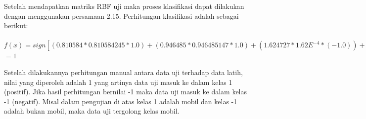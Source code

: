 Setelah mendapatkan matriks RBF uji maka proses klasifikasi dapat dilakukan dengan menggunakan persamaan 2.15. Perhitungan klasifikasi adalah sebagai berikut:\\\\
$f(x) = sign[(0.810584 * 0.810584245  * 1.0) + (0.946485 * 0.946485147 * 1.0) + (1.624727 * 1.62E^{-4} * (-1.0)) + (9.396529 * 9.396529058E^{-4} * (-1.0)) + (-0.013700) ]$\\
$=1$

Setelah dilakukannya perhitungan manual antara data uji terhadap data latih, nilai yang diperoleh adalah 1 yang artinya data uji masuk ke dalam kelas 1 (positif). Jika hasil perhitungan bernilai -1 maka data uji masuk ke dalam kelas -1 (negatif). Misal dalam pengujian di atas kelas 1 adalah mobil dan kelas -1 adalah bukan mobil, maka data uji tergolong kelas mobil.
\newpage